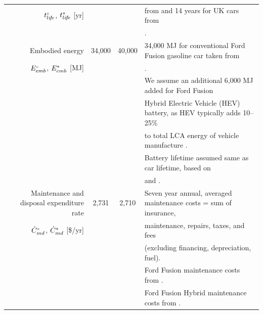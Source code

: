 \documentclass[12pt]{article}\usepackage[]{graphicx}\usepackage[]{xcolor}
\begin{document}
\begin{landscape}
\begin{table}
\begin{center}
\begin{tabular}{ r c c l }
   ${}{t}^{\scriptscriptstyle \circ}_{li\!f\!e}$, ${t}^*_{li\!f\!e}$ [yr]    &           &          & from \citet{Berla:2016} and 14 years for UK cars from \\
                                                    &           &          & \citet{SMMT:2020}. \\
 \midrule
   Embodied energy             & 34,000    & 40,000   & 34,000 MJ for conventional Ford Fusion gasoline car taken from \\
   ${}{E}^{\scriptscriptstyle \circ}_{emb}$, ${E}^*_{emb}$ [MJ]        &           &          & \citet{Argonne_National_Laboratory:2010}. \\
                                                    &           &          & We assume an additional 6,000 MJ added for Ford Fusion \\
                                                    &           &          & Hybrid Electric Vehicle (HEV) battery, as HEV typically adds 10--25\% \\
                                                    &           &          & to total LCA energy of vehicle manufacture \citep{onat2015conventional}. \\
                                                    &           &          & Battery lifetime assumed same as car lifetime, based on \\
                                                    &           &          & \citet{nordelof2014environmental} and \citet{onat2015conventional}. \\
 \midrule
  Maintenance and disposal expenditure rate  & 2,731  & 2,710    & Seven year annual, averaged maintenance costs = sum of insurance, \\
  ${}{\dot{C}}^{\scriptscriptstyle \circ}_{md}$, ${\dot{C}}^*_{md}$ [\$/yr]  &           &          & maintenance, repairs, taxes, and fees \\
                                                    &           &          & (excluding financing, depreciation, fuel). \\
                                                    &           &          & Ford Fusion maintenance costs from \citet{Edmunds:2020_fusion_gasoline}. \\
                                                    &           &          & Ford Fusion Hybrid maintenance costs from \citet{Edmunds:2020_fusion_hybrid}. \\
  \bottomrule
\end{tabular}
\end{center}
\end{table}
\end{landscape}
\end{document}
